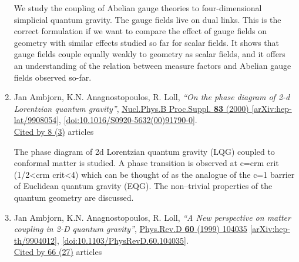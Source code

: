 \documentclass[a4paper,10pt]{article}
\begin{document}
\begin{enumerate}
We study the coupling of Abelian gauge theories to four-dimensional simplicial quantum gravity. The gauge fields live on dual links. This is the correct formulation if we want to compare the effect of gauge fields on geometry with similar effects studied so far for scalar fields. It shows that gauge fields couple equally weakly to geometry as scalar fields, and it offers an understanding of the relation between measure factors and Abelian gauge fields observed so-far.
\item Jan Ambjorn, K.N. Anagnostopoulos, R. Loll, {\it ``On the phase diagram of 2-d Lorentzian quantum gravity''}, \href{https://www.doi.org/10.1016/S0920-5632(00)91790-0}{Nucl.Phys.B Proc.Suppl. {\bf 83} (2000) } \href{https://arxiv.org/abs/hep-lat/9908054}{[arXiv:hep-lat/9908054]}, \href{https://www.doi.org/10.1016/S0920-5632(00)91790-0}{[doi:10.1016/S0920-5632(00)91790-0]}.
\\\href{https://inspirehep.net/literature/?q=refersto%3Arecid%3A506246}{Cited by 8 (3)} articles

The phase diagram of 2d Lorentzian quantum gravity (LQG) coupled to conformal matter is studied. A phase transition is observed at c=c{rm crit} (1/2<c{rm crit}<4) which can be thought of as the analogue of the c=1 barrier of Euclidean quantum gravity (EQG). The non--trivial properties of the quantum geometry are discussed.
\item Jan Ambjorn, K.N. Anagnostopoulos, R. Loll, {\it ``A New perspective on matter coupling in 2-D quantum gravity''}, \href{https://www.doi.org/10.1103/PhysRevD.60.104035}{Phys.Rev.D {\bf 60} (1999) 104035} \href{https://arxiv.org/abs/hep-th/9904012}{[arXiv:hep-th/9904012]}, \href{https://www.doi.org/10.1103/PhysRevD.60.104035}{[doi:10.1103/PhysRevD.60.104035]}.
\\\href{https://inspirehep.net/literature/?q=refersto%3Arecid%3A497759}{Cited by 66 (27)} articles


\end{enumerate}
\end{document}
